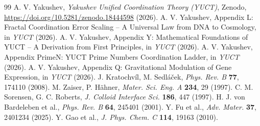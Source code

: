 \documentclass[12pt,a4paper]{article}
\begin{document}
	\begin{thebibliography}{99}
		A. V. Yakushev, \emph{Yakushev Unified Coordination Theory (YUCT)}, Zenodo, \url{https://doi.org/10.5281/zenodo.18444598} (2026).
		A. V. Yakushev, Appendix L: Fractal Coordination Error Scaling – A Universal Law from DNA to Cosmology, in \emph{YUCT} (2026).
		A. V. Yakushev, Appendix Y: Mathematical Foundations of YUCT – A Derivation from First Principles, in \emph{YUCT} (2026).
		A. V. Yakushev, Appendix PrimeN: YUCT Prime Numbers Coordination Ladder, in \emph{YUCT} (2026).
		A. V. Yakushev, Appendix Q: Gravitational Modulation of Gene Expression, in \emph{YUCT} (2026).
		J. Kratochvíl, M. Sedláček, \emph{Phys. Rev. B} \textbf{77}, 174110 (2008).
		M. Zaiser, P. Hähner, \emph{Mater. Sci. Eng. A} \textbf{234}, 29 (1997).
		C. M. Sorensen, G. C. Roberts, \emph{J. Colloid Interface Sci.} \textbf{186}, 447 (1997).
		H. J. von Bardeleben et al., \emph{Phys. Rev. B} \textbf{64}, 245401 (2001).
		Y. Fu et al., \emph{Adv. Mater.} \textbf{37}, 2401234 (2025).
		Y. Gao et al., \emph{J. Phys. Chem. C} \textbf{114}, 19163 (2010).
	\end{thebibliography}
	
\end{document}
